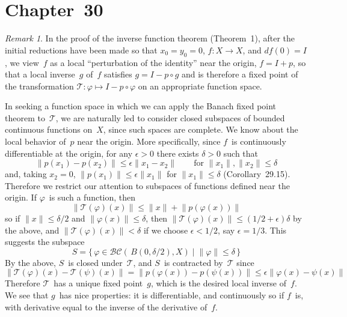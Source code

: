 \documentclass[letterpaper,12pt]{article}
\newcommand{\BC}{\mathcal{BC}}
\newcommand{\T}{\mathcal{T}}
\newcommand{\after}{\circ}
\newcommand{\df}{d\!f}
\newcommand{\norm}[1]{\lVert{#1}\rVert}
\theoremstyle{plain}
\theoremstyle{definition}
\theoremstyle{remark}
\newtheorem*{rmk}{Remark}
\begin{document}
\section*{Chapter~30}
\begin{rmk}
In the proof of the inverse function theorem (Theorem~1), after the initial reductions have been made so that \(x_0=y_0=0\), \(f:X\to X\), and \(\df(0)=I\), we view~\(f\) as a local ``perturbation of the identity'' near the origin, \(f=I+p\), so that a local inverse~\(g\) of~\(f\) satisfies \(g=I-p\after g\) and is therefore a fixed point of the transformation \(\T:\varphi\mapsto I-p\after\varphi\) on an appropriate function space.

In seeking a function space in which we can apply the Banach fixed point theorem to~\(\T\), we are naturally led to consider closed subspaces of bounded continuous functions on~\(X\), since such spaces are complete. We know about the local behavior of~\(p\) near the origin. More specifically, since \(f\)~is continuously differentiable at the origin, for any \(\epsilon>0\) there exists \(\delta>0\) such that
\[\norm{p(x_1)-p(x_2)}\le\epsilon\norm{x_1-x_2}\qquad\text{for }\norm{x_1},\norm{x_2}\le\delta\]
and, taking \(x_2=0\), \(\norm{p(x_1)}\le\epsilon\norm{x_1}\) for \(\norm{x_1}\le\delta\) (Corollary~29.15). Therefore we restrict our attention to subspaces of functions defined near the origin. If \(\varphi\)~is such a function, then
\[\norm{\T(\varphi)(x)}\le\norm{x}+\norm{p(\varphi(x))}\]
so if \(\norm{x}\le\delta/2\) and \(\norm{\varphi(x)}\le\delta\), then \(\norm{\T(\varphi)(x)}\le(1/2+\epsilon)\delta\) by the above, and \(\norm{\T(\varphi)(x)}<\delta\) if we choose \(\epsilon<1/2\), say \(\epsilon=1/3\). This suggests the subspace
\[S=\{\,\varphi\in\BC(\,B(0,\delta/2),X)\mid\norm{\varphi}\le\delta\,\}\]
By the above, \(S\)~is closed under~\(\T\), and \(S\)~is contracted by~\(\T\) since
\[\norm{\T(\varphi)(x)-\T(\psi)(x)}=\norm{p(\varphi(x))-p(\psi(x))}\le\epsilon\norm{\varphi(x)-\psi(x)}\]
Therefore \(\T\)~has a unique fixed point~\(g\), which is the desired local inverse of~\(f\). We see that \(g\)~has nice properties: it is differentiable, and continuously so if \(f\)~is, with derivative equal to the inverse of the derivative of~\(f\).
\end{rmk}
\end{document}
